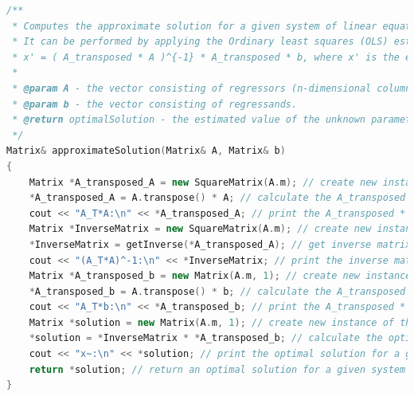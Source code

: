 \documentclass[11pt]{article}
\begin{document}
\begin{lstlisting}[language=C++, caption=Implementation of Least-squares approximation algorithm]
/**
 * Computes the approximate solution for a given system of linear equations.
 * It can be performed by applying the Ordinary least squares (OLS) estimator:
 * x' = ( A_transposed * A )^{-1} * A_transposed * b, where x' is the estimated value of the unknown parameter vector.
 *
 * @param A - the vector consisting of regressors (n-dimensional column-vectors).
 * @param b - the vector consisting of regressands.
 * @return optimalSolution - the estimated value of the unknown parameter vector.
 */
Matrix& approximateSolution(Matrix& A, Matrix& b)
{
    Matrix *A_transposed_A = new SquareMatrix(A.m); // create new instance of the class Matrix to store the A_transposed * A
    *A_transposed_A = A.transpose() * A; // calculate the A_transposed * A
    cout << "A_T*A:\n" << *A_transposed_A; // print the A_transposed * A
    Matrix *InverseMatrix = new SquareMatrix(A.m); // create new instance of the class Matrix to store the inversed A_transposed * A
    *InverseMatrix = getInverse(*A_transposed_A); // get inverse matrix for the A_transposed * A
    cout << "(A_T*A)^-1:\n" << *InverseMatrix; // print the inverse matrix for the A_transposed * A
    Matrix *A_transposed_b = new Matrix(A.m, 1); // create new instance of the class Matrix to store the A_transposed * b
    *A_transposed_b = A.transpose() * b; // calculate the A_transposed * b
    cout << "A_T*b:\n" << *A_transposed_b; // print the A_transposed * b
    Matrix *solution = new Matrix(A.m, 1); // create new instance of the class Matrix to store the optimal solution for a given system of linear equations
    *solution = *InverseMatrix * *A_transposed_b; // calculate the optimal solution for a given system of linear equations
    cout << "x~:\n" << *solution; // print the optimal solution for a given system of linear equations
    return *solution; // return an optimal solution for a given system of equations
}


\end{lstlisting}
\end{document}
